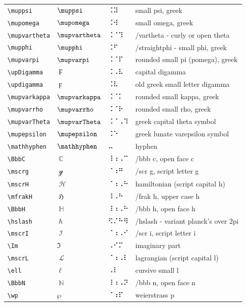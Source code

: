 \documentclass[oneside]{article}
\begin{document}
\begin{longtable}{llll}
\verb|\muppsi| & $\muppsi$ &  ⠨⠽  & {small psi, greek} \\[2ex]
\verb|\mupomega| & $\mupomega$ &  ⠨⠺  & {small omega, greek} \\[2ex]
\verb|\mupvartheta| & $\mupvartheta$ &  ⠨⠈⠹  & {/vartheta - curly or open theta} \\[2ex]
\verb|\mupphi| & $\mupphi$ &  ⠨⠋  & {/straightphi - small phi, greek} \\[2ex]
\verb|\mupvarpi| & $\mupvarpi$ &  ⠨⠈⠏  & {rounded small pi (pomega), greek} \\[2ex]
\verb|\upDigamma| & $\upDigamma$ &  ⠨⠠⠧  & {capital digamma} \\[2ex]
\verb|\updigamma| & $\updigamma$ &  ⠨⠧  & {old greek small letter digamma} \\[2ex]
\verb|\mupvarkappa| & $\mupvarkappa$ &  ⠨⠈⠅  & {rounded small kappa, greek} \\[2ex]
\verb|\mupvarrho| & $\mupvarrho$ &  ⠨⠈⠗  & {rounded small rho, greek} \\[2ex]
\verb|\mupvarTheta| & $\mupvarTheta$ &  ⠨⠈⠠⠹  & {greek capital theta symbol} \\[2ex]
\verb|\mupepsilon| & $\mupepsilon$ &  ⠨⠑  & {greek lunate varepsilon symbol} \\[2ex]
\verb|\mathhyphen| & $\mathhyphen$ &  ⠤  & {hyphen} \\[2ex]
\verb|\BbbC| & $\BbbC$ &  ⠸⠰⠠⠉  & {/bbb c, open face c} \\[2ex]
\verb|\mscrg| & $\mscrg$ &  ⠈⠰⠛  & {/scr g, script letter g} \\[2ex]
\verb|\mscrH| & $\mscrH$ &  ⠈⠰⠠⠓  & {hamiltonian (script capital h)} \\[2ex]
\verb|\mfrakH| & $\mfrakH$ &  ⠸⠠⠓  & {/frak h, upper case h} \\[2ex]
\verb|\BbbH| & $\BbbH$ &  ⠸⠰⠠⠓  & {/bbb h, open face h} \\[2ex]
\verb|\hslash| & $\hslash$ &  ⠫⠌⠓⠻  & {/hslash - variant planck's over 2pi} \\[2ex]
\verb|\mscrI| & $\mscrI$ &  ⠈⠰⠠⠊  & {/scr i, script letter i} \\[2ex]
\verb|\Im| & $\Im$ &  ⠠⠊⠍  & {imaginary part} \\[2ex]
\verb|\mscrL| & $\mscrL$ &  ⠈⠰⠠⠇  & {lagrangian (script capital l)} \\[2ex]
\verb|\ell| & $\ell$ &  ⠠⠇  & {cursive small l} \\[2ex]
\verb|\BbbN| & $\BbbN$ &  ⠸⠰⠠⠝  & {/bbb n, open face n} \\[2ex]
\verb|\wp| & $\wp$ &  ⠈⠰⠏  & {weierstrass p} \\[2ex]

\end{longtable}
\end{document}
